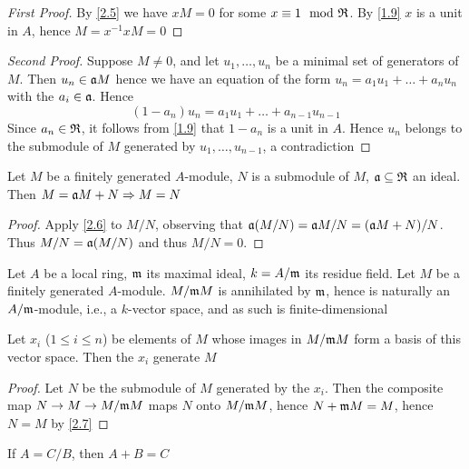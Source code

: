 \documentclass[11pt]{article}
\begin{document}
\begin{proof}[First Proof]
By \ref{2.5} we have \(xM=0\) for some \(x\equiv 1\mod{\mathfrak{R}}\). By \ref{1.9} \(x\) is a unit in \(A\), hence \(M=x^{-1}xM=0\)
\end{proof}

\begin{proof}[Second Proof]
Suppose \(M\neq 0\), and let \(u_1,\dots,u_n\) be a minimal set of generators of \(M\). Then \(u_n\in\mathfrak{a} M\)
hence we have an equation of the form \(u_n=a_1u_1+\dots+a_nu_n\) with the \(a_i\in\mathfrak{a}\). Hence
\begin{equation*}
(1-a_n)u_n=a_1u_1+\dots+a_{n-1}u_{n-1}
\end{equation*}
Since \(a_n\in\mathfrak{R}\), it follows from \ref{1.9} that \(1-a_{n}\) is a unit in \(A\). Hence \(u_n\)
belongs to the submodule of \(M\) generated by \(u_1,\dots,u_{n-1}\), a contradiction
\end{proof}

\begin{corollary}[]
\label{2.7}
Let \(M\) be a finitely generated \(A\)-module, \(N\) is a submodule of \(M\), \(\mathfrak{a}\subseteq\mathfrak{R}\) an ideal.
Then \(M=\mathfrak{a} M+N\Rightarrow M=N\)
\end{corollary}

\begin{proof}
Apply \ref{2.6} to \(M/N\), observing that \(\mathfrak{a}(M/N)=\mathfrak{a} M/N=(\mathfrak{a} M+N)/N\). Thus \(M/N=\mathfrak{a}(M/N)\) and
thus \(M/N=0\).
\end{proof}

Let \(A\) be a local ring, \(\mathfrak{m}\) its maximal ideal, \(k=A/\mathfrak{m}\) its residue field. Let \(M\) be a
finitely generated \(A\)-module. \(M/\mathfrak{m} M\) is annihilated by \(\mathfrak{m}\), hence is naturally
an \(A/\mathfrak{m}\)-module, i.e., a \(k\)-vector space, and as such is finite-dimensional

\begin{proposition}[]
Let \(x_i\) (\(1\le i\le n\)) be elements of \(M\) whose images in \(M/\mathfrak{m} M\) form a basis of this
vector space. Then the \(x_i\) generate \(M\)
\end{proposition}

\begin{proof}
Let \(N\) be the submodule of \(M\) generated by the \(x_i\). Then the composite
map \(N\to M\to M/\mathfrak{m} M\) maps \(N\) onto \(M/\mathfrak{m} M\), hence \(N+\mathfrak{m} M=M\), hence \(N=M\) by \ref{2.7}
\end{proof}

If \(A=C/B\), then \(A+B=C\)
\end{document}

